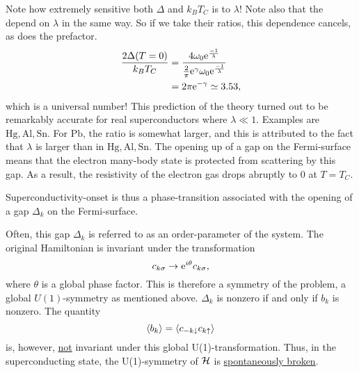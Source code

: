 Note how extremely sensitive both $\Delta$ and $k_BT_C$ is to $\lambda$! Note also that the depend on $\lambda$ in the same way. So if we take their ratios, this dependence cancels, as does the prefactor.
\begin{align} 
\frac{2\Delta(T=0)}{k_BT_C} &= \frac{4\omega_0\mathrm{e}^{\frac{-1}{\lambda}}}{\frac{2}{\pi}\mathrm{e}^{\gamma}\omega_0\mathrm{e}^{\frac{-1}{\lambda}}} \\
&=2\pi\mathrm{e}^{-\gamma} \simeq 3.53,
\end{align}
which is a universal number! This prediction of the theory turned out to be remarkably accurate for real superconductors where $\lambda\ll 1$. Examples are $\mathrm{Hg, Al, Sn}$. For $\mathrm{Pb}$, the ratio is somewhat larger, and this is attributed to the fact that $\lambda$ is larger than in $\mathrm{Hg, Al, Sn}$. 
The opening up of a gap on the Fermi-surface means that the electron many-body state is protected from scattering by this gap. As a result, the resistivity of the electron gas drops abruptly to 0 at $T = T_C$. 
\begin{tcolorbox}
	Superconductivity-onset is thus a phase-transition associated with the opening of a gap $\Delta_k$ on the Fermi-surface. 
\end{tcolorbox}
Often, this gap $\Delta_k$ is referred to as an order-parameter of the system. 
The original Hamiltonian is invariant under the transformation
\begin{equation} 
c_{k\sigma} \rightarrow\mathrm{e}^{i\theta}c_{k\sigma},
\end{equation}
where $\theta$ is a global phase factor. This is therefore a symmetry of the problem, a global $U(1)$-symmetry as mentioned above.
$\Delta_k$ is nonzero if and only if $b_k$ is nonzero. The quantity
\begin{equation} 
\ev{b_k} = \ev{c_{-k\downarrow}c_{k\uparrow}}
\end{equation}
is, however, \underline{not} invariant under this global U(1)-transformation. Thus, in the superconducting state, the U(1)-symmetry of $\mathcal{H}$ is \underline{spontaneously broken}.